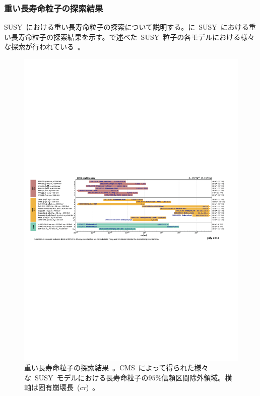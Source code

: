 \subsubsection{重い長寿命粒子の探索結果}
SUSY~における重い長寿命粒子の探索について説明する。に~SUSY~における重い長寿命粒子の探索結果を示す。で述べた~SUSY~粒子の各モデルにおける様々な探索が行われている~\cite{AR:13a,AR:13b,AR:13c,AR:13d}。
\begin{figure}[tbp]
        \centering   
        \includegraphics[width=\textwidth,page=1]{img/pdf/susy2.pdf}
        \caption[重い長寿命粒子の探索結果]{重い長寿命粒子の探索結果~\cite{AR:13a,AR:13b,AR:13c,AR:13d}。CMS~によって得られた様々な~SUSY~モデルにおける長寿命粒子の$95\%$信頼区間除外領域。横軸は固有崩壊長~($c\tau$)~。}\label{fig:susy2}
\end{figure}

